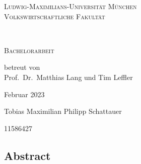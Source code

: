 \begin{titlepage}
    \vspace*{\fill}
    \centering

    \textsc{\Large Ludwig-Maximilians-Universität München}\\
    \textsc{Volkswirtschaftliche Fakultät}

    \vspace{3.2cm}

    \begin{doublespace}
        \makeatletter
        \textsc{ \Huge \titleDE}\\
        \textsc{\Large \subtitleDE}
        \makeatother
    \end{doublespace}


    \vspace{2.7cm}
    \huge \textsc{Bachelorarbeit}



    \vspace{0.3cm}
    \large \textrm{betreut von\\Prof.~Dr.~Matthias Lang und Tim Leffler}

    \vspace{2cm}
    \huge
    \textrm{Februar 2023}

    \vspace{2cm}
    \Large \textrm{Tobias Maximilian Philipp Schattauer}

    11586427

    \vspace*{\fill}
\end{titlepage}

\begin{titlepage}
    \null\vspace{3cm}
    \centering
    \begin{minipage}{0.8\textwidth}
        \section*{Abstract}
        
    \end{minipage}
\end{titlepage}



\tableofcontents
\newpage